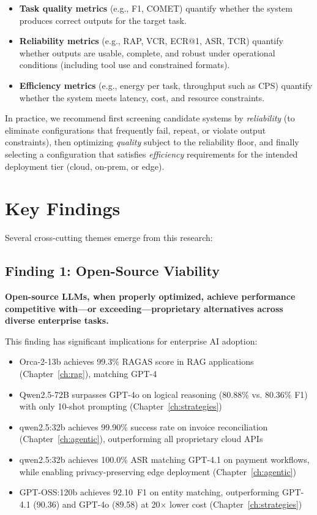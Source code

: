 \begin{itemize}
    \item \textbf{Task quality metrics} (e.g., F1, COMET) quantify whether the system produces correct outputs for the target task.
    \item \textbf{Reliability metrics} (e.g., RAP, VCR, ECR@1, ASR, TCR) quantify whether outputs are usable, complete, and robust under operational conditions (including tool use and constrained formats).
    \item \textbf{Efficiency metrics} (e.g., energy per task, throughput such as CPS) quantify whether the system meets latency, cost, and resource constraints.
\end{itemize}

In practice, we recommend first screening candidate systems by \emph{reliability} (to eliminate configurations that frequently fail, repeat, or violate output constraints), then optimizing \emph{quality} subject to the reliability floor, and finally selecting a configuration that satisfies \emph{efficiency} requirements for the intended deployment tier (cloud, on-prem, or edge).

\section{Key Findings}
\label{sec:key_findings}

Several cross-cutting themes emerge from this research:

\subsection{Finding 1: Open-Source Viability}

\textbf{Open-source LLMs, when properly optimized, achieve performance competitive with---or exceeding---proprietary alternatives across diverse enterprise tasks.}

This finding has significant implications for enterprise AI adoption:
\begin{itemize}[leftmargin=*]
    \item Orca-2-13b achieves 99.3\% RAGAS score in RAG applications (Chapter~\ref{ch:rag}), matching GPT-4
    \item Qwen2.5-72B surpasses GPT-4o on logical reasoning (80.88\% vs. 80.36\% F1) with only 10-shot prompting (Chapter~\ref{ch:strategies})
    \item qwen2.5:32b achieves 99.90\% success rate on invoice reconciliation (Chapter~\ref{ch:agentic}), outperforming all proprietary cloud APIs
    \item qwen2.5:32b achieves 100.0\% ASR matching GPT-4.1 on payment workflows, while enabling privacy-preserving edge deployment (Chapter~\ref{ch:agentic})
    \item GPT-OSS:120b achieves 92.10~F1 on entity matching, outperforming GPT-4.1 (90.36) and GPT-4o (89.58) at 20$\times$ lower cost (Chapter~\ref{ch:strategies})
\end{itemize}

